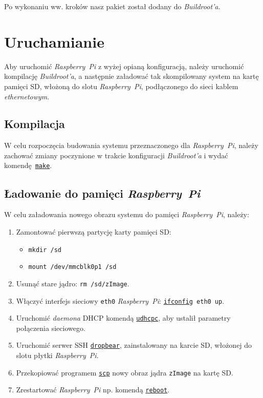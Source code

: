\documentclass{article}
\begin{document}
Po wykonaniu ww. kroków nasz pakiet  został dodany do \emph{Buildroot'a}.


\section{Uruchamianie}

Aby uruchomić \emph{Raspberry~Pi} z wyżej opianą konfiguracją, należy uruchomić kompilację \emph{Buildroot'a}, a następnie załadować tak skompilowany system na kartę pamięci SD, włożoną do slotu \emph{Raspberry~Pi}, podłączonego do sieci kablem \emph{ethernetowym}.

\subsection{Kompilacja}

W celu rozpoczęcia budowania systemu przeznaczonego dla \emph{Raspberry~Pi}, należy zachować zmiany poczynione w trakcie konfiguracji \emph{Buildroot'a} i wydać komendę~\texttt{\href{https://github.com/buildroot/buildroot/blob/master/Makefile}{make}}.


\subsection{Ładowanie do pamięci \emph{Raspberry~Pi}}

W celu załadowania nowego obrazu systemu do pamięci \emph{Raspberry~Pi}, należy:
\begin{enumerate}
\item Zamontować pierwszą partycję karty pamięci SD:
\begin{itemize}
\item \texttt{mkdir /sd}
\item \texttt{mount /dev/mmcblk0p1 /sd}
\end{itemize}
\item Usunąć stare jądro: \texttt{rm /sd/zImage}.
\item Włączyć interfejs sieciowy \texttt{eth0} \emph{Raspberry~Pi}: \texttt{\href{http://linux.die.net/man/8/ifconfig}{ifconfig} eth0 up}.
\item Uruchomić \emph{daemona} DHCP komendą \texttt{\href{http://dev.man-online.org/man8/udhcpc/}{udhcpc}}, aby ustalił parametry połączenia sieciowego.
\item Uruchomić serwer SSH \texttt{\href{https://matt.ucc.asn.au/dropbear/dropbear.html}{dropbear}}, zainstalowany na karcie SD, włożonej do slotu płytki \emph{Raspberry~Pi}.
\item Przekopiować programem \texttt{\href{http://linux.die.net/man/1/scp}{scp}} nowy obraz jądra \texttt{zImage} na kartę SD.
\item Zrestartować \emph{Raspberry~Pi} np. komendą \texttt{\href{http://linux.die.net/man/8/reboot}{reboot}}.
\end{enumerate}
\end{document}
